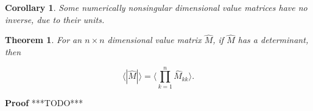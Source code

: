 \documentclass[10pt,letterpaper]{article}
\newtheorem{thm}{Theorem}[section]
\newtheorem{cor}{Corollary}[section]
\newenvironment{proof}{\noindent\textbf{Proof} }{\qed \newline}
\newcommand{\qed}{\nobreak \ifvmode \relax \else
      \ifdim\lastskip<1.5em \hskip-\lastskip
      \hskip1.5em plus0em minus0.5em \fi \nobreak
      \vrule height0.75em width0.5em depth0.25em\fi}
\numberwithin{equation}{section}
\begin{document}
\begin{cor}Some numerically nonsingular dimensional value matrices
  have no inverse, due to their units.\end{cor}

\begin{thm}For an $n \times n$ dimensional value matrix $\hat M$, if
  $\hat M$ has a determinant, then

  \[ \langle | \hat M | \rangle = \langle \prod_{k=1}^n \hat M_{kk}
  \rangle . \] \end{thm}

\begin{proof}***TODO***\end{proof}
\end{document}
